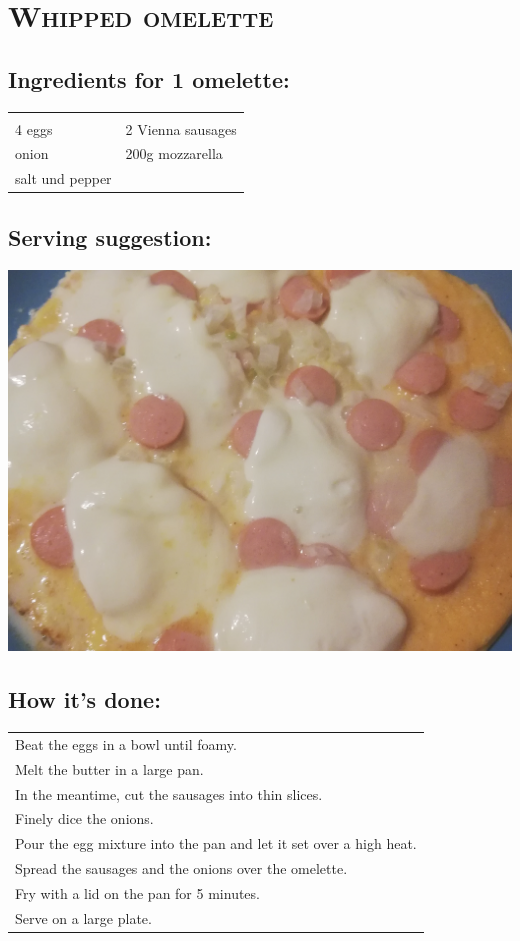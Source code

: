 \section{\textsc{Whipped omelette}}

\subsection*{Ingredients for 1 omelette:}

\begin{tabular}{p{7.5cm} p{7.5cm}}
	& \\
	4 eggs & 2 Vienna sausages \\
	\sfrac{1}{2} onion & 200g mozzarella \\
	salt und pepper &
\end{tabular}

\subsection*{Serving suggestion:}

\includegraphics[width=\textwidth]{img/omlett/omlett_wiener_fertig.jpg} \cite{omlettwiener}

\subsection*{How it's done:}

\begin{tabular}{p{15cm}}
  \\
  Beat the eggs in a bowl until foamy.\\
  Melt the butter in a large pan.\\
  In the meantime, cut the sausages into thin slices.\\
  Finely dice the onions.\\
  Pour the egg mixture into the pan and let it set over a high heat.\\
  Spread the sausages and the onions over the omelette.\\
  Fry with a lid on the pan for 5 minutes.\\
  Serve on a large plate.
\end{tabular}
